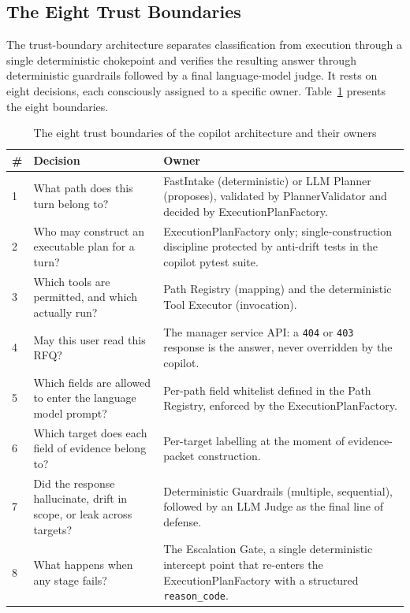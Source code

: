 \subsection{The Eight Trust Boundaries}
The trust-boundary architecture separates classification from execution through a single deterministic chokepoint and verifies the resulting answer through deterministic guardrails followed by a final language-model judge. It rests on eight decisions, each consciously assigned to a specific owner. Table~\ref{tab:trust_boundaries} presents the eight boundaries.

\begin{table}[H]
\centering
\renewcommand{\arraystretch}{1.4}
\begin{tabular}{|p{0.6cm}|p{6cm}|p{7cm}|}
\hline
\rowcolor{lightgray}
\textbf{\#} & \textbf{Decision} & \textbf{Owner} \\ \hline
1 & What path does this turn belong to? & FastIntake (deterministic) or LLM Planner (proposes), validated by PlannerValidator and decided by ExecutionPlanFactory. \\ \hline
2 & Who may construct an executable plan for a turn? & ExecutionPlanFactory only; single-construction discipline protected by anti-drift tests in the copilot pytest suite. \\ \hline
3 & Which tools are permitted, and which actually run? & Path Registry (mapping) and the deterministic Tool Executor (invocation). \\ \hline
4 & May this user read this RFQ? & The manager service API: a \texttt{404} or \texttt{403} response is the answer, never overridden by the copilot. \\ \hline
5 & Which fields are allowed to enter the language model prompt? & Per-path field whitelist defined in the Path Registry, enforced by the ExecutionPlanFactory. \\ \hline
6 & Which target does each field of evidence belong to? & Per-target labelling at the moment of evidence-packet construction. \\ \hline
7 & Did the response hallucinate, drift in scope, or leak across targets? & Deterministic Guardrails (multiple, sequential), followed by an LLM Judge as the final line of defense. \\ \hline
8 & What happens when any stage fails? & The Escalation Gate, a single deterministic intercept point that re-enters the ExecutionPlanFactory with a structured \texttt{reason\_code}. \\ \hline
\end{tabular}
\caption{The eight trust boundaries of the copilot architecture and their owners}
\label{tab:trust_boundaries}
\end{table}

